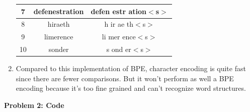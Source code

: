\begin{enumerate}[label={\arabic*.}]
\begin{center}
\begin{tabular}{ |c|c|c| }
	    \hline
	    7 & defenestration & defen estr ation$<$s$>$ \\
	    \hline
	    8 & hiraeth & h ir ae th$<$s$>$ \\
	    \hline
	    9 & limerence & li mer ence$<$s$>$ \\
	    \hline
	    10 & sonder & s ond er$<$s$>$ \\
	    \hline
	\end{tabular}
    \end{center}
    \item Compared to this implementation of BPE, character encoding is quite fast since there are fewer comparisons. But it won't perform as well a BPE encoding because it's too fine grained and can't recognize word structures.
\end{enumerate}

{\bf Problem 2: Code}

